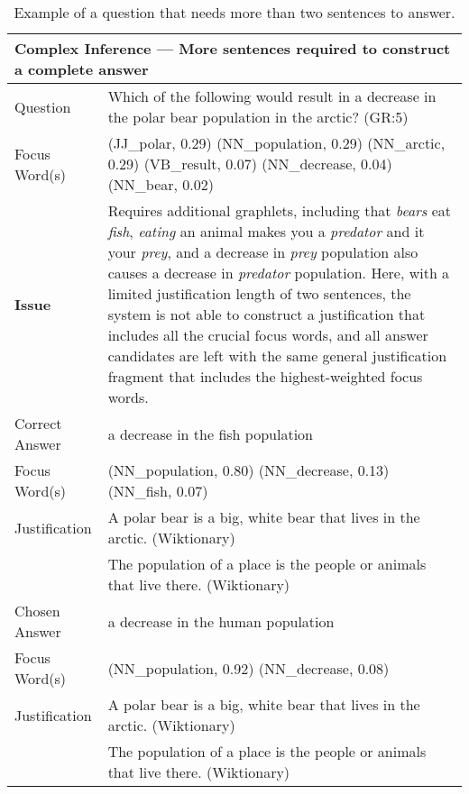 \begin{table}[]
\caption{{  Example of a question that needs more than two sentences to answer. }} 
\begin{footnotesize}
\begin{tabularx}{\textwidth}{p{2.5cm}p{10cm}}
\hline
\multicolumn{2}{l}{Complex Inference --- More sentences required to construct a complete answer} \\
\hline
Question 		& Which of the following would result in a decrease in the polar bear population in the arctic? (GR:5) \\
Focus Word(s) 	& (JJ\_polar, 0.29) (NN\_population, 0.29) (NN\_arctic, 0.29) (VB\_result, 0.07) (NN\_decrease, 0.04) (NN\_bear, 0.02) \\
\textbf{Issue}	&  Requires additional graphlets, including that \emph{bears} eat \emph{fish}, \emph{eating} an animal makes you a \emph{predator} and it your \emph{prey}, and a decrease in \emph{prey} population also causes a decrease in \emph{predator} population.  Here, with a limited justification length of two sentences, the system is not able to construct a justification that includes all the crucial focus words, and all answer candidates are left with the same general justification fragment that includes the highest-weighted focus words. \\
\hline
Correct Answer 	&  a decrease in the fish population \\
Focus Word(s) 	&  (NN\_population, 0.80) (NN\_decrease, 0.13) (NN\_fish, 0.07) \\
Justification 	& A polar bear is a big, white bear that lives in the arctic. (Wiktionary)\\
 				& The population of a place is the people or animals that live there.  (Wiktionary)\\
\hline
Chosen Answer 	& a decrease in the human population \\
Focus Word(s) 	& (NN\_population, 0.92) (NN\_decrease, 0.08) \\
Justification 	& A polar bear is a big, white bear that lives in the arctic. (Wiktionary)\\
 				& The population of a place is the people or animals that live there.  (Wiktionary)\\
\hline
\end{tabularx}
\end{footnotesize}
\label{ex:longerchains}
\end{table}

